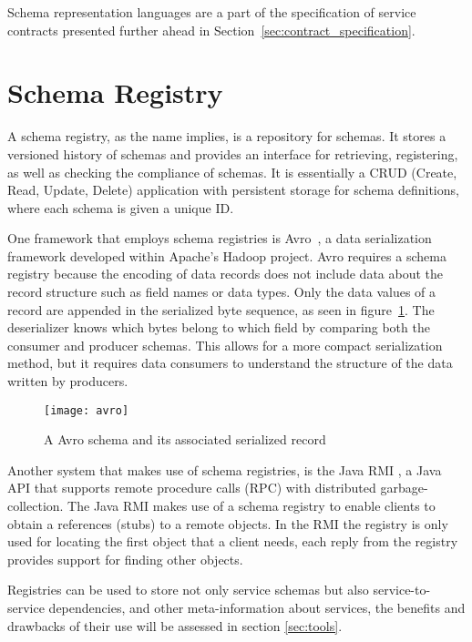 Schema representation languages are a part of the specification of service contracts
presented further ahead in Section~\ref{sec:contract_specification}.

\section{Schema Registry} %
\label{sec:schema_registry}

A schema registry, as the name implies, is a repository for schemas.
It stores a versioned history of schemas and provides an interface for retrieving, registering, as well as checking the compliance of schemas.
It is essentially a CRUD (Create, Read, Update, Delete) application with persistent storage for schema definitions, where each schema is given a unique ID.

One framework that employs schema registries is Avro~\cite{8}, a data serialization framework developed within Apache's Hadoop project.
Avro requires a schema registry because the encoding of data records does not include data about the record structure such as field names or data types.
Only the data values of a record are appended in the serialized byte sequence, as seen in figure~\ref{fig:avro}.
The deserializer knows which bytes belong to which field by comparing both the consumer and producer schemas.
This allows for a more compact serialization method, but it requires data consumers to understand the structure of the data written by producers.

\begin{figure}[htbp]
    \centering
    \texttt{[image: avro]}
    \caption{A Avro schema and its associated serialized record }
    \label{fig:avro}
\end{figure}

Another system that makes use of schema registries, is the Java RMI \cite{12},
a Java API that supports remote procedure calls (RPC) with distributed garbage-collection.
The Java RMI makes use of a schema registry to enable clients to obtain a references (stubs) to a remote objects.
In the RMI the registry is only used for locating the first object that a client needs, each reply from the registry provides
support for finding other objects.

Registries can be used to store not only service schemas but also service-to-service dependencies, and other meta-information about services, the benefits and drawbacks of their use will be
assessed in section \ref{sec:tools}.

